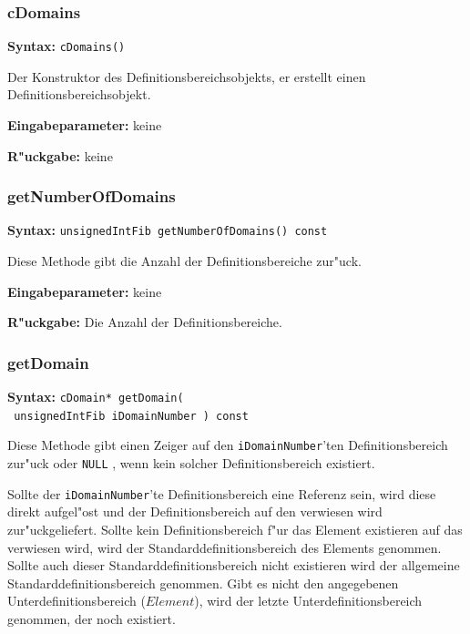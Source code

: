 \subsubsection{cDomains}

\textbf{Syntax:} \verb|cDomains()|

\bigskip\noindent
Der Konstruktor des Definitionsbereichsobjekts, er erstellt einen Definitionsbereichsobjekt.

\bigskip\noindent
\textbf{Eingabeparameter:} keine

\bigskip\noindent
\textbf{R"uckgabe:} keine


\subsubsection{getNumberOfDomains}

\textbf{Syntax:} \verb|unsignedIntFib getNumberOfDomains() const|

\bigskip\noindent
Diese Methode gibt die Anzahl der Definitionsbereiche zur"uck.

\bigskip\noindent
\textbf{Eingabeparameter:} keine

\bigskip\noindent
\textbf{R"uckgabe:} Die Anzahl der Definitionsbereiche.


\subsubsection{getDomain}

\textbf{Syntax:} \verb|cDomain* getDomain(| \\\verb| unsignedIntFib iDomainNumber ) const|

\bigskip\noindent
Diese Methode gibt einen Zeiger auf den \verb|iDomainNumber|'ten Definitionsbereich zur"uck oder \verb|NULL| , wenn kein solcher Definitionsbereich existiert.

Sollte der \verb|iDomainNumber|'te Definitionsbereich eine Referenz sein, wird diese direkt aufgel"ost und der Definitionsbereich auf den verwiesen wird zur"uckgeliefert.
Sollte kein Definitionsbereich f"ur das Element existieren auf das verwiesen wird, wird der Standarddefinitionsbereich des Elements genommen. Sollte auch dieser Standarddefinitionsbereich nicht existieren wird der allgemeine Standarddefinitionsbereich genommen.
Gibt es nicht den angegebenen Unterdefinitionsbereich ($Element$), wird der letzte Unterdefinitionsbereich genommen, der noch existiert.


